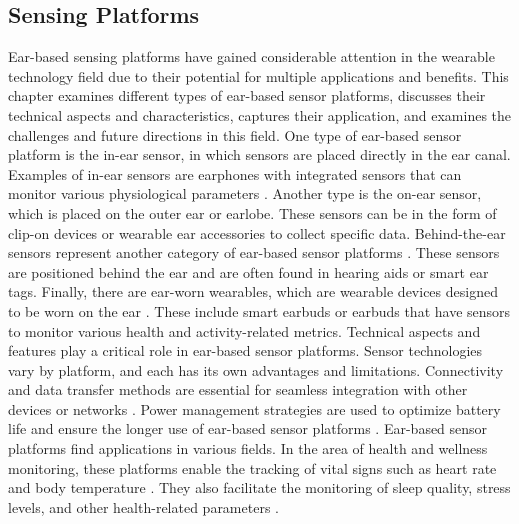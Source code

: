 \subsection{Sensing Platforms}
\label{Background:SensingWithEarables:SensingPlatforms}
Ear-based sensing platforms have gained considerable attention in the wearable technology field due to their potential for multiple applications and benefits. 
This chapter examines different types of ear-based sensor platforms, discusses their technical aspects and characteristics, captures their application, and examines the challenges and future directions in this field.
One type of ear-based sensor platform is the in-ear sensor, in which sensors are placed directly in the ear canal. Examples of in-ear sensors are earphones with integrated sensors that can monitor various physiological parameters \cite{maseHearablesNewPerspectives2020, bestbierDevelopmentVitalSigns2018, luekenPhotoplethysmographybasedInearSensor2017}. 
Another type is the on-ear sensor, which is placed on the outer ear or earlobe. 
These sensors can be in the form of clip-on devices or wearable ear accessories to collect specific data.
Behind-the-ear sensors represent another category of ear-based sensor platforms \cite{phamWAKEBehindtheearWearable2020, gilSmartWirelessEarWorn2019, biWearableSensorEating2017}.
These sensors are positioned behind the ear and are often found in hearing aids or smart ear tags. 
Finally, there are ear-worn wearables, which are wearable devices designed to be worn on the ear \cite{biWearableSensorEating2017, gilSmartWirelessEarWorn2019}. 
These include smart earbuds or earbuds that have sensors to monitor various health and activity-related metrics.
Technical aspects and features play a critical role in ear-based sensor platforms. 
Sensor technologies vary by platform, and each has its own advantages and limitations.
Connectivity and data transfer methods are essential for seamless integration with other devices or networks \cite{perezRecentAdvancesWearable2021}. 
Power management strategies are used to optimize battery life and ensure the longer use of ear-based sensor platforms \cite{nguyenInearBiosignalRecording2016}.
Ear-based sensor platforms find applications in various fields. 
In the area of health and wellness monitoring, these platforms enable the tracking of vital signs such as heart rate and body temperature \cite{roddigerRespirationRateMonitoring2020, atallahErgonomicWearableCore2018, maseHearablesNewPerspectives2020, rajbhandaryFeasibilityContinuousMonitoring2020a}.
They also facilitate the monitoring of sleep quality, stress levels, and other health-related parameters \cite{luekenPhotoplethysmographybasedInearSensor2017, wendtThermoregulationExerciseHeat2007}. 
